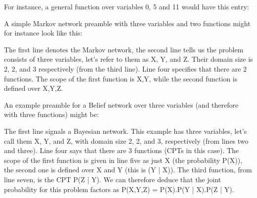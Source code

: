 \documentclass[letterpaper,10pt,openany,oneside,english]{sphinxmanual}
\begin{document}
\begin{itemize}
\sphinxAtStartPar
For instance, a general function over variables 0, 5 and 11 would have this entry:

\begin{sphinxVerbatim}[commandchars=\\\{\}]
   
\end{sphinxVerbatim}

\sphinxAtStartPar
A simple Markov network preamble with three variables and two functions might for instance look like this:

\begin{sphinxVerbatim}[commandchars=\\\{\}]
  
  
   
\end{sphinxVerbatim}

\sphinxAtStartPar
The first line denotes the Markov network, the second line tells us the problem consists of three variables, let’s refer to them as X, Y, and Z. Their domain size is 2, 2, and 3 respectively (from the third line). Line four specifies that there are 2 functions. The scope of the first function is X,Y, while the second function is defined over X,Y,Z.

\sphinxAtStartPar
An example preamble for a Belief network over three variables (and therefore with three functions) might be:

\begin{sphinxVerbatim}[commandchars=\\\{\}]
  
 
  
  
\end{sphinxVerbatim}

\sphinxAtStartPar
The first line signals a Bayesian network. This example has three variables, let’s call them X, Y, and Z, with domain size 2, 2, and 3, respectively (from lines two and three). Line four says that there are 3 functions (CPTs in this case). The scope of the first function is given in line five as just X (the probability P(X)), the second one is defined over X and Y (this is (Y | X)). The third function, from line seven, is the CPT P(Z | Y). We can therefore deduce that the joint probability for this problem factors as P(X,Y,Z) = P(X).P(Y | X).P(Z | Y).


\end{itemize}
\end{document}
